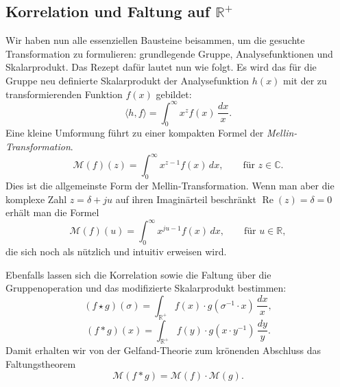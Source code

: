 \subsection{Korrelation und Faltung auf $\mathbb{R^+}$
\label{mellin:subsection:faltung}}
Wir haben nun alle essenziellen Bausteine beisammen, um die gesuchte 
Transformation zu formulieren: grundlegende Gruppe, Analysefunktionen 
und Skalarprodukt.
Das Rezept dafür lautet nun wie folgt. Es wird das für die Gruppe neu 
definierte Skalarprodukt der Analysefunktion $h(x)$ mit der zu 
transformierenden Funktion $f(x)$ gebildet:
\begin{equation}
    \langle h,f \rangle 
    = \int_0^\infty x^{z} f(x) \,\frac{{d}x}{x}
    .
\end{equation}
Eine kleine Umformung führt zu einer kompakten Formel der 
{\em Mellin-Transformation}.
\begin{equation}
    \mathcal{M}(f)(z) 
    = \int_{0}^{\infty} x^{z-1} f(x) \,{d}x,
    \qquad\text{für $z \in \mathbb{C}$}
    .
    \label{mellin:mellin}
\end{equation}
Dies ist die allgemeinste Form der Mellin-Transformation. 
Wenn man aber die komplexe Zahl $z = \delta + ju$ auf ihren 
Imaginärteil beschränkt $\operatorname{Re}(z) = \delta = 0$ erhält 
man die Formel
\begin{equation}
    \mathcal{M}(f)(u) 
    = \int_{0}^{\infty} x^{ju-1} f(x) \,{d}x,
    \qquad\text{für $u \in \mathbb{R}$}
    ,
    \label{mellin:mellinu}
\end{equation}
die sich noch als nützlich und intuitiv erweisen wird.

Ebenfalls lassen sich die Korrelation sowie die Faltung über die 
Gruppenoperation und das modifizierte Skalarprodukt bestimmen:
\begin{equation}
    (f \star g)(\sigma ) 
    = \int_\mathbb{R^+} 
    f(x) \cdot g(\sigma ^{-1} \cdot x)\,\frac{{d}x}{x}
    ,
    \label{mellin:kreuzkorrelation*}
\end{equation}
\begin{equation}
    (f \ast g)(x) 
    = \int_\mathbb{R^+} 
    f(y) \cdot g(x \cdot y^{-1})\,\frac{{d}y}{y} 
    .
\end{equation}
Damit erhalten wir von der Gelfand-Theorie zum krönenden Abschluss 
das Faltungstheorem
\begin{equation}
    \mathcal{M}\left(f \ast g\right)
    = \mathcal{M}\left(f\right) \cdot \mathcal{M}\left(g\right)
    .
\end{equation}


